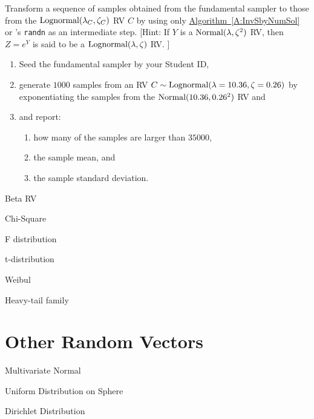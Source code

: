 \begin{labwork}\label{LW:lognormal}
Transform a sequence of samples obtained from the fundamental sampler to those from the $\mbox{{\rm Lognormal}}(\lambda_C,\zeta_C)$ RV $C$ by using only  \hyperref[A:InvSbyNumSol]{Algorithm~\ref*{A:InvSbyNumSol}} or \Matlab's {\tt randn} as an intermediate step.   [Hint: %
If $Y$ is a $\mbox{{\rm Normal}}(\lambda,\zeta^2)$ RV, then $Z=e^Y$ is said to be a $\mbox{{\rm Lognormal}}(\lambda,\zeta)$ RV.  ]
\begin{enumerate}
\item Seed the fundamental sampler by your Student ID,
\item generate $1000$ samples from an RV $C\sim \mbox{{\rm Lognormal}}(\lambda=10.36, \zeta=0.26)$ by exponentiating the samples from the $\mbox{{\rm Normal}}(10.36,0.26^2)$ RV and
\item and report:
\begin{enumerate}
\item how many of the samples are larger than $35000$,
\item the sample mean, and
\item the sample standard deviation.
\end{enumerate}
\end{enumerate}

\end{labwork}

Beta RV

Chi-Square

F distribution

t-distribution

Weibul

Heavy-tail family

\section{Other Random Vectors}\label{S:OtherRVecs}

Multivariate Normal

Uniform Distribution on Sphere

Dirichlet Distribution



